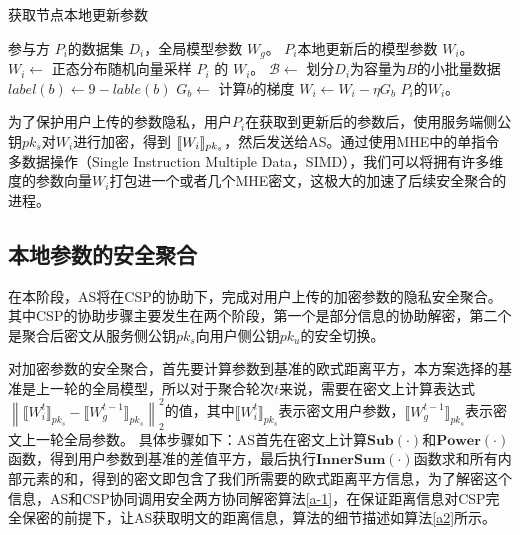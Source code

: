 \begin{algorithm}[htbp]
	\caption{获取节点本地更新参数}
	\label{a1}
	\begin{algorithmic}[1]
		\REQUIRE 参与方 $P_i$的数据集 $D_i$，全局模型参数 $W_g$。
		\ENSURE $P_i$本地更新后的模型参数 $W_i$。
		\STATE $W_i \leftarrow$ 正态分布随机向量采样
		\RETURN $P_i$ 的 $W_i$。
		\ELSE
		\STATE $\mathcal{B}\leftarrow$ 划分$D_i$为容量为$ B $的小批量数据
		\STATE $label(b) \leftarrow 9-lable(b)$
		\ENDIF
		\STATE $G_{b}\leftarrow$ 计算$b$的梯度
		\STATE $W_i\leftarrow W_i - \eta G_{b}$
		\ENDFOR
		\ENDFOR
		\RETURN $P_i$的$W_i$。
		\ENDIF
	\end{algorithmic}
\end{algorithm}

为了保护用户上传的参数隐私，用户$P_i$在获取到更新后的参数后，使用服务端侧公钥$ pk_s $对$ W_i $进行加密，得到 $ \ctx[pk_s]{W_i} $，然后发送给AS。通过使用MHE中的单指令多数据操作（Single Instruction Multiple Data，SIMD），我们可以将拥有许多维度的参数向量$W_i$打包进一个或者几个MHE密文，这极大的加速了后续安全聚合的进程。

\subsection{本地参数的安全聚合}
在本阶段，AS将在CSP的协助下，完成对用户上传的加密参数的隐私安全聚合。其中CSP的协助步骤主要发生在两个阶段，第一个是部分信息的协助解密，第二个是聚合后密文从服务侧公钥$ pk_s $向用户侧公钥$pk_u$的安全切换。

对加密参数的安全聚合，首先要计算参数到基准的欧式距离平方，本方案选择的基准是上一轮的全局模型，所以对于聚合轮次$ t $来说，需要在密文上计算表达式$\left\| \llbracket W_i^{t} \rrbracket_{pk_s} - \llbracket W_g^{t-1} \rrbracket_{pk_s} \right\|_2^2$的值，其中$ \llbracket W_i^{t} \rrbracket_{pk_s} $表示密文用户参数，$ \llbracket W_g^{t-1} \rrbracket_{pk_s} $表示密文上一轮全局参数。
具体步骤如下：AS首先在密文上计算$\textbf{Sub}(\cdot)$和$ \textbf{Power}(\cdot) $函数，得到用户参数到基准的差值平方，最后执行$ \textbf{InnerSum}(\cdot) $函数求和所有内部元素的和，得到的密文即包含了我们所需要的欧式距离平方信息，为了解密这个信息，AS和CSP协同调用安全两方协同解密算法\ref{a-1}，在保证距离信息对CSP完全保密的前提下，让AS获取明文的距离信息，算法的细节描述如算法\ref{a2}所示。

